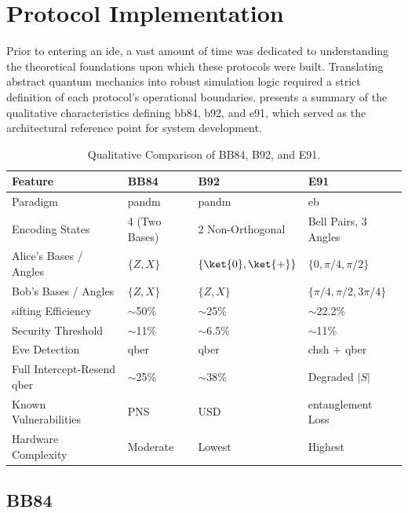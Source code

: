 \newpage
\section{Protocol Implementation}
\label{sec:protocolimplementation}

Prior to entering an \gls{ide}, a vast amount of time was dedicated to understanding the theoretical foundations upon which these protocols were built. Translating abstract quantum mechanics into robust simulation logic required a strict definition of each protocol's operational boundaries.  presents a summary of the qualitative characteristics defining \gls{bb84}, \gls{b92}, and \gls{e91}, which served as the architectural reference point for system development.

\begin{table}[h]
\centering
\caption{Qualitative Comparison of BB84, B92, and E91.}
\label{tab:protocol-comparison}
\footnotesize
\begin{tabularx}{\linewidth}{@{}l X X X@{}}
\toprule
\textbf{Feature} & \textbf{BB84} & \textbf{B92} & \textbf{E91} \\
\midrule
Paradigm & \gls{pandm} & \gls{pandm} & \gls{eb} \\
Encoding States & 4 (Two Bases) & 2 Non-Orthogonal & Bell Pairs, 3 Angles \\
Alice's Bases / Angles & $\{Z, X\}$ & $\{\ket{0}, \ket{+}\}$ & $\{0, \pi/4, \pi/2\}$ \\
Bob's Bases / Angles & $\{Z, X\}$ & $\{Z, X\}$ & $\{\pi/4, \pi/2, 3\pi/4\}$ \\
\gls{sifting} Efficiency & $\sim$50\% & $\sim$25\% & $\sim$22.2\% \\
Security Threshold & $\sim$11\% & $\sim$6.5\% & $\sim$11\% \\
Eve Detection & \gls{qber} & \gls{qber} & \gls{chsh} $+$ \gls{qber} \\
Full Intercept-Resend \gls{qber} & $\sim$25\% & $\sim$38\% & Degraded $|S|$ \\
Known Vulnerabilities & PNS & USD & \gls{entanglement} Loss \\
Hardware Complexity & Moderate & Lowest & Highest \\
\bottomrule
\end{tabularx}
\end{table}

\subsection{BB84}
\label{subsec:bb84}

